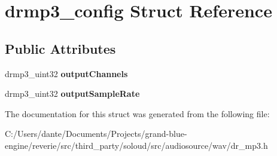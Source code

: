 \hypertarget{structdrmp3__config}{}\section{drmp3\+\_\+config Struct Reference}
\label{structdrmp3__config}
\subsection*{Public Attributes}
\begin{DoxyCompactItemize}
\item 
\mbox{\label{structdrmp3__config_a414dc46beae254b791c6d8ab3b8263c3}} 
drmp3\+\_\+uint32 {\bfseries output\+Channels}
\item 
\mbox{\label{structdrmp3__config_a1a01591ac7fa6a9a0f570e69e7b97755}} 
drmp3\+\_\+uint32 {\bfseries output\+Sample\+Rate}
\end{DoxyCompactItemize}


The documentation for this struct was generated from the following file\+:\begin{DoxyCompactItemize}
\item 
C\+:/\+Users/dante/\+Documents/\+Projects/grand-\/blue-\/engine/reverie/src/third\+\_\+party/soloud/src/audiosource/wav/dr\+\_\+mp3.\+h\end{DoxyCompactItemize}
